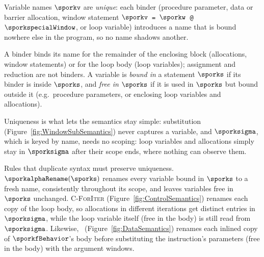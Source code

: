 
Variable names $\sporkv$ are \emph{unique}:
each binder (procedure parameter, data or barrier allocation, window statement \texttt{$\sporkv$ = $\sporkw$ @ $\sporkspecialWindow$}, or loop variable)
introduces a name that is bound nowhere else in the program, so no name shadows another.

A binder binds its name for the remainder of the enclosing block (allocations, window statements) or for the loop body (loop variables);
assignment and reduction are not binders.
A variable is \emph{bound in} a statement $\sporks$ if its binder is inside $\sporks$, and \emph{free in} $\sporks$ if it is used in $\sporks$ but bound outside it
(e.g.\ procedure parameters, or enclosing loop variables and allocations).

Uniqueness is what lets the semantics stay simple:
substitution (Figure~\ref{fig:WindowSubSemantics}) never captures a variable,
and $\sporksigma$, which is keyed by name, needs no scoping:
loop variables and allocations simply stay in $\sporksigma$ after their scope ends, where nothing can observe them.

Rules that duplicate syntax must preserve uniqueness.
$\sporkalphaRename(\sporks)$ renames every variable bound in $\sporks$ to a fresh name, consistently throughout its scope,
and leaves variables free in $\sporks$ unchanged.
\textsc{C-ForIter} (Figure~\ref{fig:ControlSemantics}) renames each copy of the loop body,
so allocations in different iterations get distinct entries in $\sporksigma$,
while the loop variable itself (free in the body) is still read from $\sporksigma$.
Likewise, \sporkDInstrSub\ (Figure~\ref{fig:DataSemantics}) renames each inlined copy of $\sporkfBehavior$'s body
before substituting the instruction's parameters (free in the body) with the argument windows.

